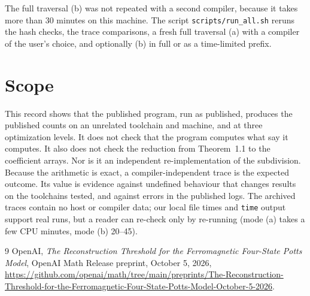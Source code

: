 \documentclass[11pt]{amsart}
\begin{document}
The full traversal (b) was not repeated with a second compiler, because it takes more than 30 minutes
on this machine. The script \texttt{scripts/run\_all.sh} reruns the hash checks, the trace comparisons,
a fresh full traversal (a) with a compiler of the user's choice, and optionally (b) in full or as a
time-limited prefix.

\section{Scope}
This record shows that the published program, run as published, produces the published counts on
an unrelated toolchain and machine, and at three optimization levels. It does not check that the
program computes what \cite[Sections~3--6 and Appendix~A]{oai} say it computes. It also does not
check the reduction from Theorem~1.1 to the coefficient arrays. Nor is it an independent
re-implementation of the subdivision. Because the arithmetic is exact, a compiler-independent trace
is the expected outcome. Its value is evidence against undefined behaviour that changes results on the
toolchains tested, and against errors in the published logs. The archived traces contain no host or
compiler data; our local file times and \texttt{time} output support real runs, but a reader can
re-check only by re-running (mode (a) takes a few CPU minutes, mode (b) 20--45).

\begin{thebibliography}{9}
 OpenAI, \emph{The Reconstruction Threshold for the Ferromagnetic Four-State Potts Model},
OpenAI Math Release preprint, October 5, 2026,
\url{https://github.com/openai/math/tree/main/preprints/The-Reconstruction-Threshold-for-the-Ferromagnetic-Four-State-Potts-Model-October-5-2026}.
\end{thebibliography}
\end{document}
